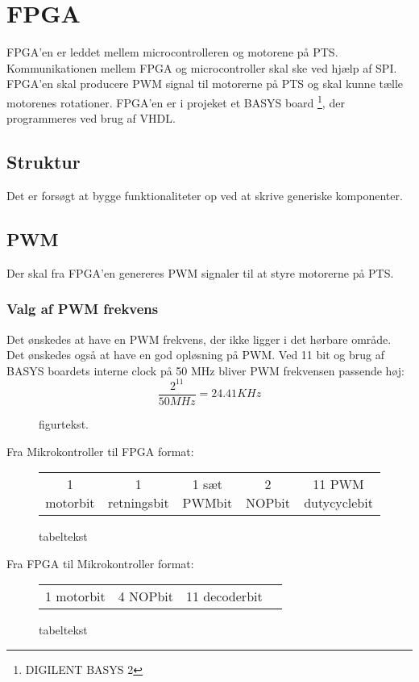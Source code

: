 \section{FPGA}
\label{sec:FPGA}

FPGA'en er leddet mellem microcontrolleren og motorene på PTS. 
Kommunikationen mellem FPGA og microcontroller skal ske ved hjælp af SPI. 
FPGA'en skal producere PWM signal til motorerne på PTS og skal kunne tælle motorenes rotationer. 
FPGA'en er i projeket et BASYS board \footnote{DIGILENT BASYS 2}, der programmeres ved brug af VHDL.

\subsection{Struktur}
Det er forsøgt at bygge funktionaliteter op ved at skrive generiske komponenter. 

\subsection{PWM}
Der skal fra FPGA'en genereres PWM signaler til at styre motorerne på PTS.
\subsubsection*{Valg af PWM frekvens}
Det ønskedes at have en PWM frekvens, der ikke ligger i det hørbare område. 
Det ønskedes også at have en god opløsning på PWM. 
Ved 11 bit og brug af BASYS boardets interne clock på 50 MHz bliver PWM frekvensen passende høj:
\begin{equation}
  \frac{2^{11}}{50 MHz} = 24.41 KHz 
\end{equation}

\begin{figure}[!th]
\centering
\begin{tikzpicture}[node distance = 5 cm,scale=1]

\end{tikzpicture}
\caption[tekst i indholdsfortegnelsen]{figurtekst.}
\label{fig:FPGA_blok}
\end{figure}




Fra Mikrokontroller til FPGA format:
\begin{figure}[th!]
\centering
\begin{tabular}{c|c|c|c|c}
1 motorbit &1 retningsbit & 1 sæt PWMbit & 2 NOPbit & 11 PWM dutycyclebit

\end{tabular}
\captionsetup{type=figure}
\caption[tekst i indholdsfortegnelsen]{tabeltekst}
\label{tb:}
\end{figure}




Fra FPGA til Mikrokontroller format:
\begin{figure}[th!]
\centering
\begin{tabular}{c|c|c|c}
1 motorbit & 4 NOPbit & 11 decoderbit

\end{tabular}
\captionsetup{type=figure}
\caption[tekst i indholdsfortegnelsen]{tabeltekst}
\label{tb:}
\end{figure}